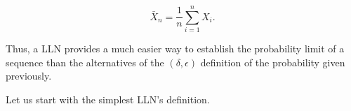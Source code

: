 \begin{equation*}
\bar{X}_n = \frac{1}{n}\sum_{i = 1}^n X_i.
\end{equation*}

Thus, a LLN provides a much easier way to establish the probability limit of a sequence than the alternatives of the $(\delta, \epsilon)$ definition of the probability given previously. 






Let us start with the simplest LLN's definition. 

